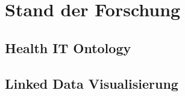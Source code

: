 \chapter{Stand der Forschung}\label{ch:relatedWork}

\section{Health IT Ontology}

\section{Linked Data Visualisierung}




